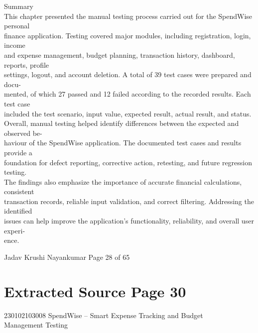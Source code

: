 \documentclass[12pt,a4paper]{report}
\begin{document}
 Summary\\ 

\smallskip
This chapter presented the manual testing process carried out for the SpendWise personal\\ 
finance application. Testing covered major modules, including registration, login, income\\ 
and expense management, budget planning, transaction history, dashboard, reports, profile\\ 
settings, logout, and account deletion. A total of 39 test cases were prepared and docu-\\ 
mented, of which 27 passed and 12 failed according to the recorded results. Each test case\\ 
included the test scenario, input value, expected result, actual result, and status.\\ 
Overall, manual testing helped identify differences between the expected and observed be-\\ 
haviour of the SpendWise application. The documented test cases and results provide a\\ 
foundation for defect reporting, corrective action, retesting, and future regression testing.\\ 
The findings also emphasize the importance of accurate financial calculations, consistent\\ 
transaction records, reliable input validation, and correct filtering. Addressing the identified\\ 
issues can help improve the application’s functionality, reliability, and overall user experi-\\ 
ence.\\ 

\smallskip

\smallskip

\smallskip

\smallskip
Jadav Krushi Nayankumar                                                         Page 28 of 65\\ 

\clearpage
\section*{Extracted Source Page 30}
230102103008                          SpendWise – Smart Expense Tracking and Budget\\ 
Management Testing\\ 

\smallskip
\end{document}

